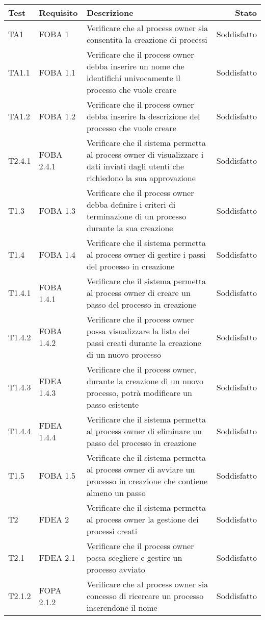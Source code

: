 \begin{longtable}{llXr}%
\toprule
\textbf{Test} & \textbf{Requisito} & \textbf{Descrizione} & \textbf{Stato}\\
\toprule
TA1&FOBA 1&Verificare che al process owner sia consentita la creazione di processi&Soddisfatto\\
\midrule
TA1.1&FOBA 1.1&Verificare che il process owner debba inserire un nome che identifichi univocamente il processo che vuole creare&Soddisfatto\\
\midrule
TA1.2&FOBA 1.2&Verificare che il process owner debba inserire la descrizione del processo che vuole creare &Soddisfatto\\
\midrule
T2.4.1&FOBA 2.4.1&Verificare che il sistema permetta al process owner di visualizzare i dati inviati dagli utenti che richiedono la sua approvazione&Soddisfatto\\
\midrule
T1.3&FOBA 1.3&Verificare che il process owner debba definire i criteri di terminazione di un processo durante la sua creazione&Soddisfatto\\
\midrule
T1.4&FOBA 1.4&Verificare che il sistema permetta al process owner di gestire i passi del processo in creazione&Soddisfatto\\
T1.4.1&FOBA 1.4.1&Verificare che il sistema permetta al process owner di creare un passo del processo in creazione&Soddisfatto\\
\midrule
T1.4.2&FOBA 1.4.2&Verificare che il process owner possa visualizzare la lista dei passi creati durante la creazione di un nuovo processo&Soddisfatto\\
\midrule
T1.4.3&FDEA 1.4.3&Verificare che il process owner, durante la creazione di un nuovo processo, potrà modificare un passo esistente&Soddisfatto\\
\midrule
T1.4.4&FDEA 1.4.4&Verificare che il sistema permetta al process owner di eliminare un passo del processo in creazione&Soddisfatto\\
\midrule
T1.5&FOBA 1.5&Verificare che il sistema permetta al process owner di avviare un processo in creazione che contiene almeno un passo&Soddisfatto\\
\midrule
T2&FDEA 2&Verificare che il sistema permetta al process owner la gestione dei processi creati&Soddisfatto\\
T2.1&FDEA 2.1&Verificare che il process owner possa scegliere e gestire un processo avviato&Soddisfatto\\
\midrule
T2.1.2&FOPA 2.1.2&Verificare che al process owner sia concesso di ricercare un processo inserendone il nome&Soddisfatto\\

\end{longtable}
